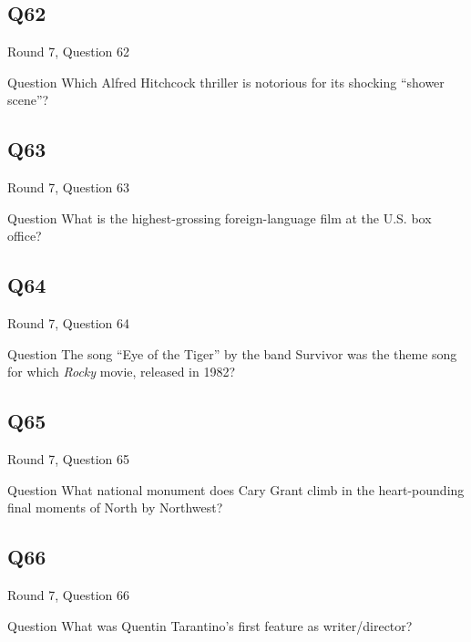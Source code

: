 \documentclass[11pt]{beamer}
\begin{document}
\subsection*{Q62}
\begin{frame}[t]{Round 7, Question 62}
\vspace{2em}
\begin{block}{Question}
Which Alfred Hitchcock thriller is notorious for its shocking ``shower scene''?
\end{block}
\end{frame}
    

\subsection*{Q63}
\begin{frame}[t]{Round 7, Question 63}
\vspace{2em}
\begin{block}{Question}
What is the highest-grossing foreign-language film at the U.S. box office?
\end{block}
\end{frame}
    

\subsection*{Q64}
\begin{frame}[t]{Round 7, Question 64}
\vspace{2em}
\begin{block}{Question}
The song ``Eye of the Tiger'' by the band Survivor was the theme song for which \emph{Rocky} movie, released in 1982?
\end{block}
\end{frame}
    

\subsection*{Q65}
\begin{frame}[t]{Round 7, Question 65}
\vspace{2em}
\begin{block}{Question}
What national monument does Cary Grant climb in the heart-pounding final moments of North by Northwest?
\end{block}
\end{frame}
    

\subsection*{Q66}
\begin{frame}[t]{Round 7, Question 66}
\vspace{2em}
\begin{block}{Question}
What was Quentin Tarantino's first feature as writer/director?
\end{block}
\end{frame}
    
\end{document}
